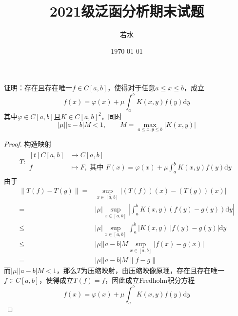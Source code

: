 \documentclass[lang = cn, scheme = chinese]{elegantbook}
\title{2021级泛函分析期末试题}                %
\author{若水}                        %
\date{\today}                       %
\begin{document}
	
\maketitle       %

\frontmatter     %

\tableofcontents %

\mainmatter      %

\chapter{}

\begin{proposition}
	证明：存在且存在唯一$f\in C[a,b]$，使得对于任意$a\le x \le b$，成立
	$$
	f(x)=\varphi(x)+\mu\int_a^bK(x,y)f(y)\mathrm{d}y
	$$
	其中$\varphi\in C[a,b]$且$K\in C[a,b]^2$，同时
	$$
	|\mu||a-b|M<1,\qquad 
	M=\max_{a\le x,y\le b}|K(x,y)|
	$$
\end{proposition}

\begin{proof}
	构造映射
	\begin{align*}
		T:\begin{aligned}[t]
			C[a,b]&\longrightarrow C[a,b]\\
			f&\longmapsto F,\text{ 其中 }F(x)=\varphi(x)+\mu\int_a^bK(x,y)f(y)\mathrm{d}y
		\end{aligned}
	\end{align*}
	由于
	\begin{align*}
		\|T(f)-T(g)\|
		=&\sup_{x\in[a,b]}|(T(f))(x)-(T(g))(x)|\\
		=&|\mu|\sup_{x\in[a,b]}\left| \int_a^bK(x,y)(f(y)-g(y))\mathrm{d}y \right|\\
		\le & |\mu|\sup_{x\in[a,b]}\int_a^b|K(x,y)||f(y)-g(y)|\mathrm{d}y\\
		\le & |\mu||a-b|M\sup_{x\in[a,b]}|f(x)-g(x)|\\
		=& |\mu||a-b|M\|f-g\|
	\end{align*}
	而$|\mu||a-b|M<1$，那么$T$为压缩映射，由压缩映像原理，存在且存在唯一$f\in C[a,b]$，使得成立$T(f)=f$​，因此成立Fredholm积分方程
	$$
	f(x)=\varphi(x)+\mu\int_a^bK(x,y)f(y)\mathrm{d}y
	$$
\end{proof}

\chapter{}
\end{document}
